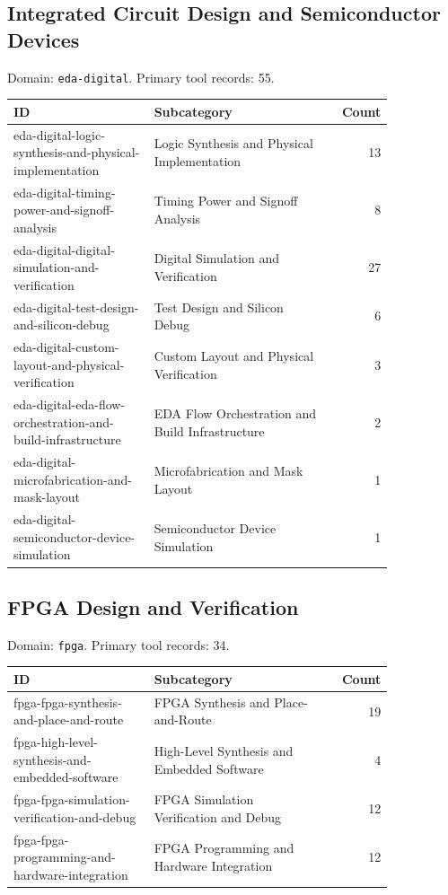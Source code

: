 \subsection{Integrated Circuit Design and Semiconductor Devices}
\noindent Domain: \texttt{eda-digital}. Primary tool records: 55.
\begin{longtable}{p{0.37\linewidth}p{0.47\linewidth}r}
ID & Subcategory & Count\\\hline\endhead
eda-digital-logic-synthesis-and-physical-implementation & Logic Synthesis and Physical Implementation & 13\\
eda-digital-timing-power-and-signoff-analysis & Timing Power and Signoff Analysis & 8\\
eda-digital-digital-simulation-and-verification & Digital Simulation and Verification & 27\\
eda-digital-test-design-and-silicon-debug & Test Design and Silicon Debug & 6\\
eda-digital-custom-layout-and-physical-verification & Custom Layout and Physical Verification & 3\\
eda-digital-eda-flow-orchestration-and-build-infrastructure & EDA Flow Orchestration and Build Infrastructure & 2\\
eda-digital-microfabrication-and-mask-layout & Microfabrication and Mask Layout & 1\\
eda-digital-semiconductor-device-simulation & Semiconductor Device Simulation & 1\\
\end{longtable}
\subsection{FPGA Design and Verification}
\noindent Domain: \texttt{fpga}. Primary tool records: 34.
\begin{longtable}{p{0.37\linewidth}p{0.47\linewidth}r}
ID & Subcategory & Count\\\hline\endhead
fpga-fpga-synthesis-and-place-and-route & FPGA Synthesis and Place-and-Route & 19\\
fpga-high-level-synthesis-and-embedded-software & High-Level Synthesis and Embedded Software & 4\\
fpga-fpga-simulation-verification-and-debug & FPGA Simulation Verification and Debug & 12\\
fpga-fpga-programming-and-hardware-integration & FPGA Programming and Hardware Integration & 12\\
\end{longtable}
